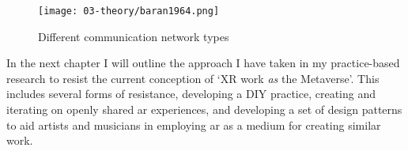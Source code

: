 \begin{figure}[ht]
    \centering
    \texttt{[image: 03-theory/baran1964.png]}
    \captionsetup{justification=centering,margin=1.5cm}
    \caption{Different communication network types \citep[in][]{baran1964}}\label{fig: baran1964}
\end{figure}


In the next chapter I will outline the approach I have taken in my practice-based research to resist the current conception of `XR work \textit{as} the Metaverse'. This includes several forms of resistance, developing a DIY practice, creating and iterating on openly shared \gls{ar} experiences, and developing a set of design patterns to aid artists and musicians in employing \gls{ar} as a medium for creating similar work.